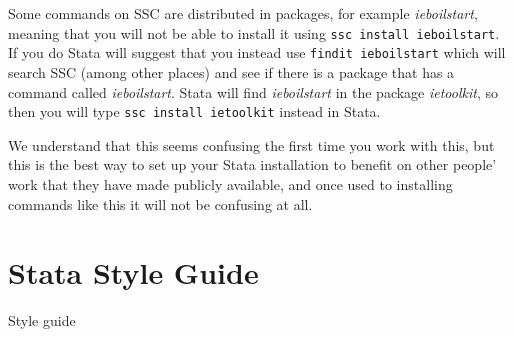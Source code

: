 Some commands on SSC are distributed in packages, for example \textit{ieboilstart}, meaning that you will 
not be able to install it using \verb+ssc install ieboilstart+. If you do Stata will suggest that you 
instead use \verb+findit ieboilstart+ which will search SSC (among other places) and see if there is a 
package that has a command called \textit{ieboilstart}. Stata will find \textit{ieboilstart} in the package 
\textit{ietoolkit}, so then you will type \verb+ssc install ietoolkit+ instead in Stata.

We understand that this seems confusing the first time you work with this, but this is the best way to set 
up your Stata installation to benefit on other people' work that they have made publicly available, and 
once used to installing commands like this it will not be confusing at all.

\section{Stata Style Guide}

Style guide

\mainmatter
